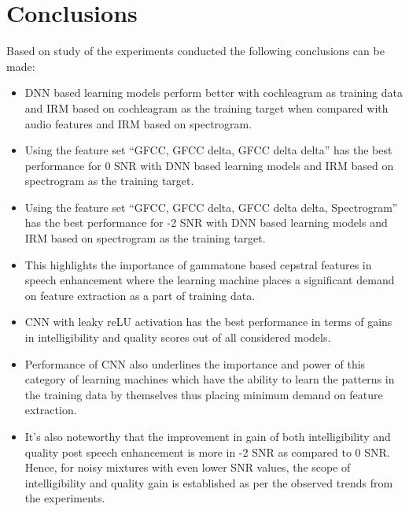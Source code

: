 \section{\textbf{Conclusions}}
Based on study of the experiments conducted the following conclusions can be made:
\begin{itemize}
\item DNN based learning models perform better with cochleagram as training data and IRM based on cochleagram as the training target when compared with audio features and IRM based on spectrogram.
\item Using the feature set \enquote{GFCC, GFCC delta, GFCC delta delta} has the best performance for 0 SNR with DNN based learning models and IRM based on spectrogram as the training target.
\item Using the feature set \enquote{GFCC, GFCC delta, GFCC delta delta, Spectrogram} has the best performance for -2 SNR with DNN based learning models and IRM based on spectrogram as the training target. 
\item This highlights the importance of gammatone based cepstral features in speech enhancement where the learning machine places a significant demand on feature extraction as a part of training data.
\item CNN with leaky reLU activation has the best performance in terms of gains in intelligibility and quality scores out of all considered models. \item Performance of CNN also underlines the importance and power of this category of learning machines which have the ability to learn the patterns in the training data by themselves thus placing minimum demand on feature extraction. 
\item It's also noteworthy that the improvement in gain of both intelligibility and quality post speech enhancement is more in -2 SNR as compared to 0 SNR. Hence, for noisy mixtures with even lower SNR values, the scope of intelligibility and quality gain is established as per the observed trends from the experiments.
\end{itemize}
